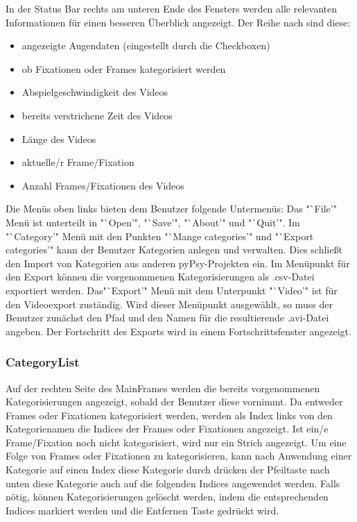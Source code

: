 \documentclass[a4paper,draft]{scrartcl}
\begin{document}
In der Status Bar rechts am unteren Ende des Fensters werden alle relevanten Informationen für einen besseren Überblick angezeigt. Der Reihe nach sind diese:
\begin{itemize}
\item angezeigte Augendaten (eingestellt durch die Checkboxen)
\item ob Fixationen oder Frames kategorisiert werden
\item Abspielgeschwindigkeit des Videos
\item bereits verstrichene Zeit des Videos
\item Länge des Videos
\item aktuelle/r Frame/Fixation 
\item Anzahl Frames/Fixationen des Videos
\end{itemize}
Die Menüs oben links bieten dem Benutzer folgende Untermenüs:
Das "`File'" Menü ist unterteilt in "`Open'", "`Save'", "`About'" und "`Quit'". 
Im "`Category'" Menü mit den Punkten "`Mange categories'" und "`Export categories'" kann der Benutzer Kategorien anlegen und verwalten. Dies schließt den Import von Kategorien aus anderen pyPsy-Projekten ein.
Im Menüpunkt für den Export können die vorgenommenen Kategorisierungen als .csv-Datei exportiert werden. 
Das"`Export'" Menü mit dem Unterpunkt "`Video'" ist für den Videoexport zuständig. Wird dieser Menüpunkt ausgewählt, so muss der Benutzer zunächst den Pfad und den Namen für die resultierende .avi-Datei angeben. Der Fortschritt des Exports wird in einem Fortschrittsfenster angezeigt.


\subsubsection{CategoryList}
Auf der rechten Seite des MainFrames werden die bereits vorgenommenen Kategorisierungen angezeigt, sobald der Benutzer diese vornimmt. 
Da entweder Frames oder Fixationen kategorisiert werden, werden als Index links von den Kategorienamen die Indices der Frames oder Fixationen angezeigt. Ist ein/e Frame/Fixation noch nicht kategorisiert, wird nur ein Strich angezeigt.
Um eine Folge von Frames oder Fixationen zu kategorisieren, kann nach Anwendung einer Kategorie auf einen Index diese Kategorie durch drücken der Pfeiltaste nach unten diese Kategorie auch auf die folgenden Indices angewendet werden.
Falls nötig, können Kategorisierungen gelöscht werden, indem die entsprechenden Indices markiert werden und die Entfernen Taste gedrückt wird. 
\end{document}
